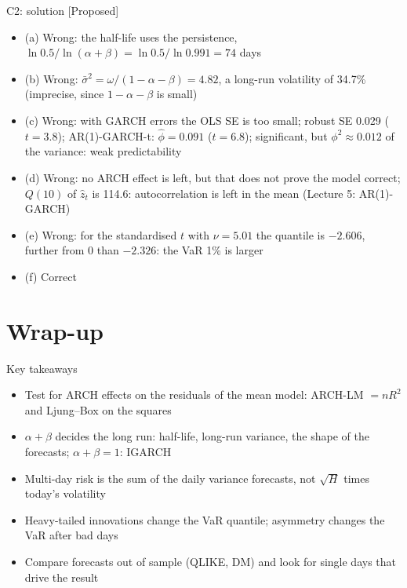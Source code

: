 \ifsolutions
\begin{frame}{C2: solution [Proposed]}
\itemsize{\footnotesize}
\begin{itemize}
    \item (a) Wrong: the half-life uses the persistence, $\ln 0.5/\ln(\alpha + \beta) = \ln 0.5/\ln 0.991 = 74$ days
    \item (b) Wrong: $\bar\sigma^2 = \omega/(1 - \alpha - \beta) = 4.82$, a long-run volatility of 34.7\% (imprecise, since $1 - \alpha - \beta$ is small)
    \item (c) Wrong: with GARCH errors the OLS SE is too small; robust SE 0.029 ($t = 3.8$); AR(1)-GARCH-t: $\hat\phi = 0.091$ ($t = 6.8$); significant, but $\phi^2 \approx 0.012$ of the variance: weak predictability
    \item (d) Wrong: no ARCH effect is left, but that does not prove the model correct; $Q(10)$ of $\hat z_t$ is 114.6: autocorrelation is left in the mean (Lecture 5: AR(1)-GARCH)
    \item (e) Wrong: for the standardised $t$ with $\nu = 5.01$ the quantile is $-2.606$, further from 0 than $-2.326$: the VaR 1\% is larger
    \item (f) Correct
\end{itemize}
\end{frame}
\fi


\section{Wrap-up}

\begin{frame}{Key takeaways}
\itemsize{\small}
\begin{itemize}
    \item Test for ARCH effects on the residuals of the mean model: ARCH-LM $= nR^2$ and Ljung--Box on the squares
    \item $\alpha + \beta$ decides the long run: half-life, long-run variance, the shape of the forecasts; $\alpha + \beta = 1$: IGARCH
    \item Multi-day risk is the sum of the daily variance forecasts, not $\sqrt{H}$ times today's volatility
    \item Heavy-tailed innovations change the VaR quantile; asymmetry changes the VaR after bad days
    \item Compare forecasts out of sample (QLIKE, DM) and look for single days that drive the result
\end{itemize}
\end{frame}

